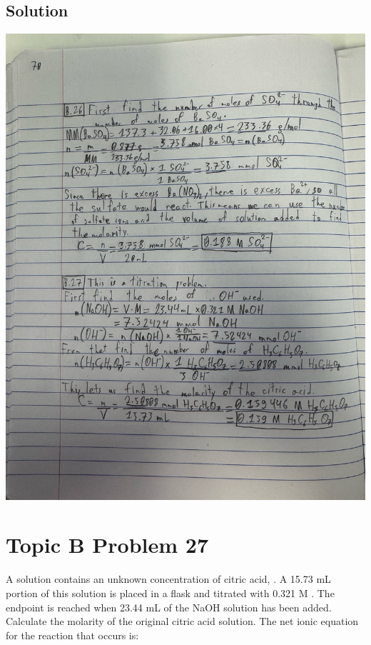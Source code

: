 \documentclass[10pt]{article}
\begin{document}
        \subsection{Solution}
            \begin{center}
                \includegraphics[width=\textwidth, trim={5in 27in 1in 6in},clip]{"Answers Images/IMG_6656.jpg"}
            \end{center}

    \pagebreak
    \section{Topic B Problem 27}
        A solution contains an unknown concentration of citric acid, . 
        A 15.73 mL portion of this solution is placed in a flask and titrated with 0.321 M . 
        The endpoint is reached when 23.44 mL of the NaOH solution has been added. 
        Calculate the molarity of the original citric acid solution. 
        The net ionic equation for the reaction that occurs is:
        \begin{center}
        \end{center}
\end{document}
